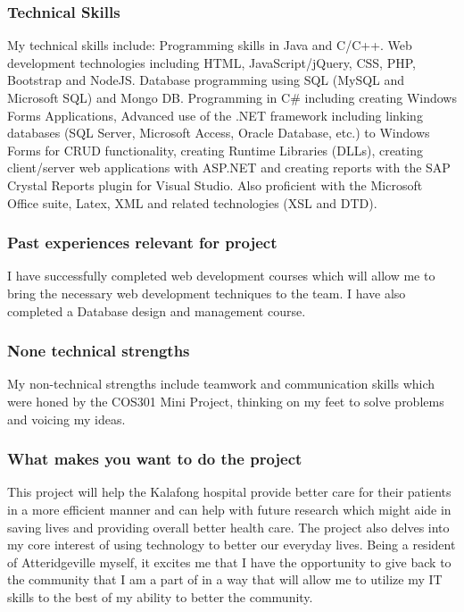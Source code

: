 \documentclass[hidelinks, 12pt, oneside]{article}
\begin{document}
\subsubsection{Technical Skills}
My technical skills include: Programming skills in Java and C/C++. Web development technologies including HTML, JavaScript/jQuery, CSS, PHP, Bootstrap and NodeJS. Database programming using SQL (MySQL and Microsoft SQL) and Mongo DB. Programming in C\# including creating Windows Forms Applications, Advanced use of the .NET framework including linking databases (SQL Server, Microsoft Access, Oracle Database, etc.) to Windows Forms for CRUD functionality, creating Runtime Libraries (DLLs), creating client/server web applications with ASP.NET and creating reports with the SAP Crystal Reports plugin for Visual Studio. Also proficient with the Microsoft Office suite, Latex, XML and related technologies (XSL and DTD).
\subsubsection{Past experiences relevant for project}
I have successfully completed web development courses which will allow me to bring the necessary web development techniques to the team. I have also completed a Database design and management course.
\subsubsection{None technical strengths}
My non-technical strengths include teamwork and communication skills which were honed by the COS301 Mini Project, thinking on my feet to solve problems and voicing my ideas.
\subsubsection{What makes you want to do the project}
This project will help the Kalafong hospital provide better care for their patients in a more efficient manner and can help with future research which might aide in saving lives and providing overall better health care. The project also delves into my core interest of using technology to better our everyday lives. Being a resident of Atteridgeville myself, it excites me that I have the opportunity to give back to the community that I am a part of in a way that will allow me to utilize my IT skills to the best of my ability to better the community.
\end{document}
